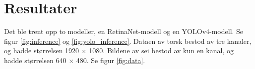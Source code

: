 

\section{Resultater}
\label{part:results}

Det ble trent opp to modeller, en RetinaNet-modell og en YOLOv4-modell. Se figur \ref{fig:inference} og \ref{fig:yolo_inference}. Dataen av torsk bestod av tre kanaler, og hadde størrelsen 1920 $\times$ 1080. Bildene av sei bestod av kun en kanal, og hadde størrelsen 640 $\times$ 480. Se figur \ref{fig:data}.



